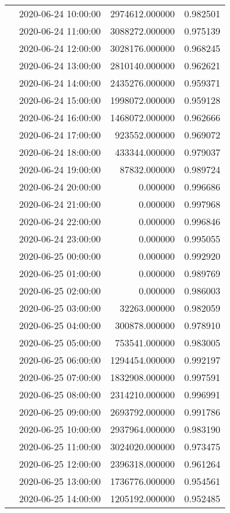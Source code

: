 \begin{tabular}{llrr}
 & 2020-06-24 10:00:00 & 2974612.000000 & 0.982501 \\
 & 2020-06-24 11:00:00 & 3088272.000000 & 0.975139 \\
 & 2020-06-24 12:00:00 & 3028176.000000 & 0.968245 \\
 & 2020-06-24 13:00:00 & 2810140.000000 & 0.962621 \\
 & 2020-06-24 14:00:00 & 2435276.000000 & 0.959371 \\
 & 2020-06-24 15:00:00 & 1998072.000000 & 0.959128 \\
 & 2020-06-24 16:00:00 & 1468072.000000 & 0.962666 \\
 & 2020-06-24 17:00:00 & 923552.000000 & 0.969072 \\
 & 2020-06-24 18:00:00 & 433344.000000 & 0.979037 \\
 & 2020-06-24 19:00:00 & 87832.000000 & 0.989724 \\
 & 2020-06-24 20:00:00 & 0.000000 & 0.996686 \\
 & 2020-06-24 21:00:00 & 0.000000 & 0.997968 \\
 & 2020-06-24 22:00:00 & 0.000000 & 0.996846 \\
 & 2020-06-24 23:00:00 & 0.000000 & 0.995055 \\
 & 2020-06-25 00:00:00 & 0.000000 & 0.992920 \\
 & 2020-06-25 01:00:00 & 0.000000 & 0.989769 \\
 & 2020-06-25 02:00:00 & 0.000000 & 0.986003 \\
 & 2020-06-25 03:00:00 & 32263.000000 & 0.982059 \\
 & 2020-06-25 04:00:00 & 300878.000000 & 0.978910 \\
 & 2020-06-25 05:00:00 & 753541.000000 & 0.983005 \\
 & 2020-06-25 06:00:00 & 1294454.000000 & 0.992197 \\
 & 2020-06-25 07:00:00 & 1832908.000000 & 0.997591 \\
 & 2020-06-25 08:00:00 & 2314210.000000 & 0.996991 \\
 & 2020-06-25 09:00:00 & 2693792.000000 & 0.991786 \\
 & 2020-06-25 10:00:00 & 2937964.000000 & 0.983190 \\
 & 2020-06-25 11:00:00 & 3024020.000000 & 0.973475 \\
 & 2020-06-25 12:00:00 & 2396318.000000 & 0.961264 \\
 & 2020-06-25 13:00:00 & 1736776.000000 & 0.954561 \\
 & 2020-06-25 14:00:00 & 1205192.000000 & 0.952485 \\

\end{tabular}
